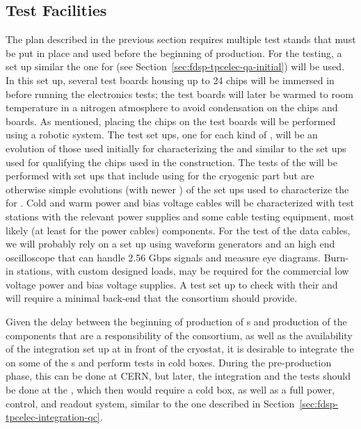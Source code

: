 \subsection{Test Facilities}
\label{sec:fdsp-tpcelec-production-facilities}

The  plan described in the previous section requires
multiple test stands that must be put in place and used 
before the beginning of production. For the 
testing, a set up similar the one for  (see
Section~\ref{sec:fdsp-tpcelec-qa-initial}) will
be used. In this set up, several test boards housing up to 24
chips will be immersed in \lntwo before running the
electronics tests; the test boards will later be warmed to room temperature in 
a nitrogen atmosphere to avoid condensation on the chips and
boards. As mentioned, placing the chips on the test 
boards will be performed using a robotic system. The test set ups,
one for each kind of , will be an evolution of those
used initially for characterizing the  and similar
to the set ups used for qualifying the chips used in the 
construction. The tests of the  will be performed with
set ups that include using  for the cryogenic part
but are otherwise simple evolutions (with newer )
of the set ups used to characterize the 
for . Cold and warm power and bias voltage cables will
be characterized with test stations with the relevant 
power supplies and some cable testing equipment, most likely (at least for the power cables)  components.
For the test of the data cables, we will probably rely on a set up
using waveform generators and an high end oscilloscope that 
can handle 2.56 Gbps signals and measure eye diagrams. 
Burn-in stations, with custom designed loads, may be required for 
the commercial low voltage power and bias voltage supplies.
A test set up to check  with their 
and  will require a minimal  back-end that the
 consortium should provide.

Given the delay between the beginning of production of 
s and production of the components that are a responsibility of
the  consortium, as well as the availability of the
integration set up at  in front of the cryostat, it is
desirable to  integrate the 
on some of the s and perform tests in cold
boxes. During the pre-production phase, this can be done at CERN,
but later, the integration and the
tests should be done at the , which then would require a cold box,
as well as a full power, control, and readout system, similar
to the one described in Section~\ref{sec:fdsp-tpcelec-integration-qc}.
